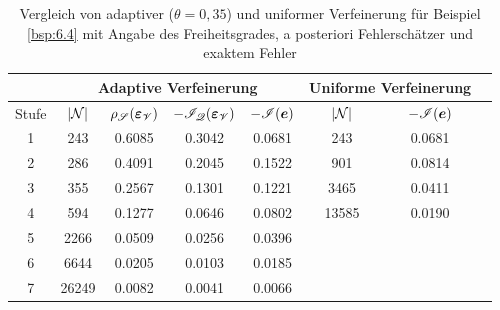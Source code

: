 \begin{bsp}

\begin{table}[h]
\centering
\begin{tabular}[c]{|c|c|c|c|c|c|c|c|}
	\hline
	 & \multicolumn{4}{c|}{Adaptive Verfeinerung} & \multicolumn{2}{c|}{Uniforme Verfeinerung} \\
	\hline
	Stufe & $\lvert \mathcal N\rvert$ & $\rho_{\mathscr S}(\boldsymbol {\varepsilon}_{\mathscr V})$ & $-\mathscr I_{\mathscr Q} (\boldsymbol{\varepsilon}_{\mathscr V})$ & $-\mathscr I(\boldsymbol e)$ & $\lvert \mathcal N\rvert$ & $-\mathscr I (\boldsymbol e)$ \\
	\hline
	 1 &  243   &  0.6085 & 0.3042 & 0.0681 &243 & 0.0681 \\
	 2 &  286 & 0.4091 &0.2045  & 0.1522 & 901 & 0.0814  \\
	 3 & 355  & 0.2567 &  0.1301& 0.1221 & 3465 & 0.0411 \\
	 4 & 594  & 0.1277 &0.0646 & 0.0802 &13585 & 0.0190  \\
	 5 &2266  & 0.0509 & 0.0256 &  0.0396  & & \\
	 6 & 6644  & 0.0205 & 0.0103 &  0.0185 & & \\
	 7 & 26249 & 0.0082 & 0.0041 &  0.0066 &  & \\
	\hline
\end{tabular}
\caption[Vergleich von adaptiver und uniformer Verfeinerung für Beispiel \ref{bsp:6.4}]{\label{tab:6.4}Vergleich von adaptiver ($\theta = 0,35$) und uniformer Verfeinerung für Beispiel \ref{bsp:6.4} mit Angabe des Freiheitsgrades, a posteriori Fehlerschätzer und exaktem Fehler}
\end{table}
    

\end{bsp}
